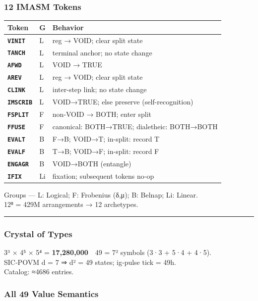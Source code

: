 \documentclass[12pt,a4paper]{article}
\begin{document}
\hypertarget{imasm-tokens}{%
\subsubsection{12 IMASM Tokens}\label{imasm-tokens}}

\begin{longtable}[]{@{}lll@{}}
\toprule
Token & G & Behavior\tabularnewline
\midrule
\endhead
\textbf{\texttt{VINIT}} & L & reg → VOID; clear split
state\tabularnewline
\textbf{\texttt{TANCH}} & L & terminal anchor; no state
change\tabularnewline
\textbf{\texttt{AFWD}} & L & VOID → TRUE\tabularnewline
\textbf{\texttt{AREV}} & L & reg → VOID; clear split
state\tabularnewline
\textbf{\texttt{CLINK}} & L & inter-step link; no state
change\tabularnewline
\textbf{\texttt{IMSCRIB}} & L & VOID→TRUE; else preserve
(self-recognition)\tabularnewline
\textbf{\texttt{FSPLIT}} & F & non‑VOID → BOTH; enter
split\tabularnewline
\textbf{\texttt{FFUSE}} & F & canonical: BOTH→TRUE; dialetheic:
BOTH→BOTH\tabularnewline
\textbf{\texttt{EVALT}} & B & F→B; VOID→T; in-split: record
T\tabularnewline
\textbf{\texttt{EVALF}} & B & T→B; VOID→F; in-split: record
F\tabularnewline
\textbf{\texttt{ENGAGR}} & B & VOID→BOTH (entangle)\tabularnewline
\textbf{\texttt{IFIX}} & Li & fixation; subsequent tokens
no‑op\tabularnewline
\bottomrule
\end{longtable}

Groups --- L: Logical; F: Frobenius (δ,μ); B: Belnap; Li: Linear.\\
12⁸ = 429M arrangements → 12 archetypes.

\begin{center}\rule{0.5\linewidth}{0.5pt}\end{center}

\hypertarget{crystal-of-types}{%
\subsubsection{Crystal of Types}\label{crystal-of-types}}

3³ × 4⁵ × 5⁴ = \textbf{17,280,000} 49 = 7² symbols (3·3 + 5·4 + 4·5).\\
SIC‑POVM d = 7 ⇒ d² = 49 states; ig‑pulse tick = 49h.\\
Catalog: ≈4686 entries.

\hypertarget{all-49-value-semantics}{%
\subsubsection{All 49 Value Semantics}\label{all-49-value-semantics}}
\end{document}
